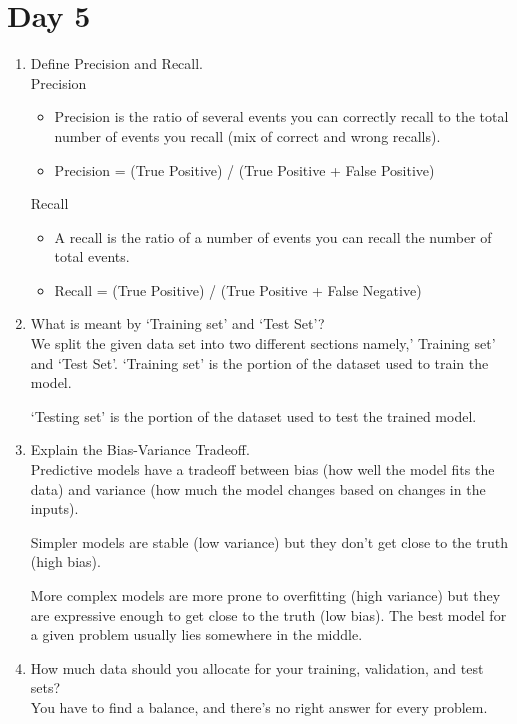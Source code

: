 \documentclass[11pt]{article}
\begin{document}
\section{Day 5}
\begin{enumerate}
\item Define Precision and Recall.\\[.5em]
Precision
\begin{itemize}
\item Precision is the ratio of several events you can correctly recall to the total number of
events you recall (mix of correct and wrong recalls).
\item Precision = (True Positive) / (True Positive + False Positive)
\end{itemize}
Recall
\begin{itemize}
\item A recall is the ratio of a number of events you can recall the number of total events.
\item Recall = (True Positive) / (True Positive + False Negative)
\end{itemize}

\item What is meant by ‘Training set’ and ‘Test Set’?\\[.5em]
We split the given data set into two different sections namely,’ Training set’ and ‘Test Set’.
‘Training set’ is the portion of the dataset used to train the model.

‘Testing set’ is the portion of the dataset used to test the trained model.

\item Explain the Bias-Variance Tradeoff.\\[.5em]
Predictive models have a tradeoff between bias (how well the model fits the data) and variance
(how much the model changes based on changes in the inputs).

Simpler models are stable (low variance) but they don't get close to the truth (high bias).

More complex models are more prone to overfitting (high variance) but they are expressive
enough to get close to the truth (low bias). The best model for a given problem usually lies
somewhere in the middle.

\item How much data should you allocate for your training, validation, and test
sets?\\[.5em]
You have to find a balance, and there's no right answer for every problem.


\end{enumerate}
\end{document}
